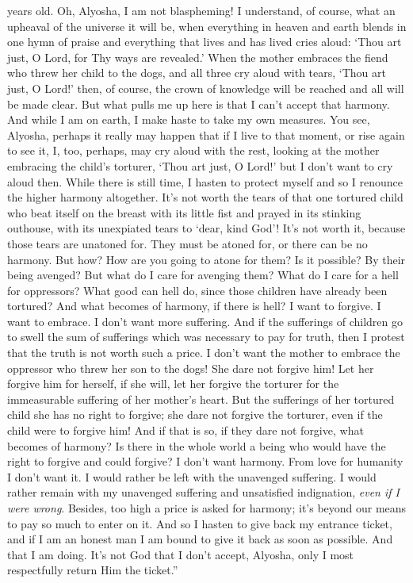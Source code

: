 years old. Oh, Alyosha, I am not blaspheming! I understand, of course,
what an upheaval of the universe it will be, when everything in heaven
and earth blends in one hymn of praise and everything that lives and
has lived cries aloud: `Thou art just, O Lord, for Thy ways are
revealed.' When the mother embraces the fiend who threw her child to
the dogs, and all three cry aloud with tears, `Thou art just, O Lord!'
then, of course, the crown of knowledge will be reached and all will
be made clear. But what pulls me up here is that I can't accept that
harmony. And while I am on earth, I make haste to take my own
measures. You see, Alyosha, perhaps it really may happen that if I
live to that moment, or rise again to see it, I, too, perhaps, may cry
aloud with the rest, looking at the mother embracing the child's
torturer, `Thou art just, O Lord!' but I don't want to cry aloud then.
While there is still time, I hasten to protect myself and so I
renounce the higher harmony altogether. It's not worth the tears of
that one tortured child who beat itself on the breast with its little
fist and prayed in its stinking outhouse, with its unexpiated tears to
`dear, kind God'! It's not worth it, because those tears are unatoned
for. They must be atoned for, or there can be no harmony. But how? How
are you going to  atone for them? Is it possible? By their
being avenged? But what do I care for avenging them? What do I care
for a hell for oppressors? What good can hell do, since those children
have already been tortured? And what becomes of harmony, if there is
hell? I want to forgive. I want to embrace. I don't want more
suffering. And if the sufferings of children go to swell the sum of
sufferings which was necessary to pay for truth, then I protest that
the truth is not worth such a price. I don't want the mother to
embrace the oppressor who threw her son to the dogs! She dare not
forgive him! Let her forgive him for herself, if she will, let her
forgive the torturer for the immeasurable suffering of her mother's
heart. But the sufferings of her tortured child she has no right to
forgive; she dare not forgive the torturer, even if the child were to
forgive him! And if that is so, if they dare not forgive, what becomes
of harmony? Is there in the whole world a being who would have the
right to forgive and could forgive? I don't want harmony. From love
for humanity I don't want it. I would rather be left with the
unavenged suffering. I would rather remain with my unavenged suffering
and unsatisfied indignation, \textit{even if I were wrong}. Besides,
too high a price is asked for harmony; it's beyond our means to pay so
much to enter on it. And so I hasten to give back my entrance ticket,
and if I am an honest man I am bound to give it back as soon as
possible. And that I am doing. It's not God that I don't accept,
Alyosha, only I most respectfully return Him the ticket.''

